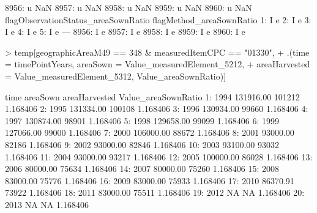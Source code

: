 \documentclass[nojss]{jss}
\begin{document}
\begin{Schunk}
\begin{Soutput}
8956:                               u                 NaN
8957:                               u                 NaN
8958:                               u                 NaN
8959:                               u                 NaN
8960:                               u                 NaN
      flagObservationStatus_areaSownRatio flagMethod_areaSownRatio
   1:                                   I                        e
   2:                                   I                        e
   3:                                   I                        e
   4:                                   I                        e
   5:                                   I                        e
  ---                                                             
8956:                                   I                        e
8957:                                   I                        e
8958:                                   I                        e
8959:                                   I                        e
8960:                                   I                        e
\end{Soutput}
\begin{Sinput}
> temp[geographicAreaM49 == 348 & measuredItemCPC == "01330",
+      .(time = timePointYears, areaSown = Value_measuredElement_5212,
+        areaHarvested = Value_measuredElement_5312, Value_areaSownRatio)]
\end{Sinput}
\begin{Soutput}
    time  areaSown areaHarvested Value_areaSownRatio
 1: 1994 131916.00        101212            1.168406
 2: 1995 131334.00        100108            1.168406
 3: 1996 130934.00         99660            1.168406
 4: 1997 130874.00         98901            1.168406
 5: 1998 129658.00         99099            1.168406
 6: 1999 127066.00         99000            1.168406
 7: 2000 106000.00         88672            1.168406
 8: 2001  93000.00         82186            1.168406
 9: 2002  93000.00         82846            1.168406
10: 2003  93100.00         93032            1.168406
11: 2004  93000.00         93217            1.168406
12: 2005 100000.00         86028            1.168406
13: 2006  80000.00         75634            1.168406
14: 2007  80000.00         75260            1.168406
15: 2008  83000.00         75776            1.168406
16: 2009  83000.00         75933            1.168406
17: 2010  86370.91         73922            1.168406
18: 2011  83000.00         75511            1.168406
19: 2012        NA            NA            1.168406
20: 2013        NA            NA            1.168406
\end{Soutput}
\end{Schunk}
\end{document}
